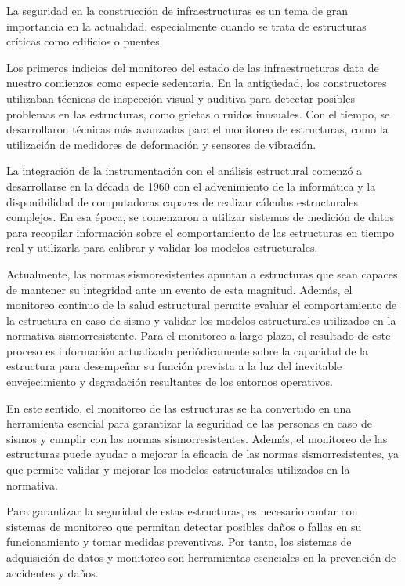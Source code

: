 \documentclass[12pt,letterpaper]{article}
\begin{document}
La seguridad en la construcción de infraestructuras es un tema de gran importancia en la actualidad, especialmente cuando se trata de estructuras críticas como edificios o puentes.

Los primeros indicios del monitoreo del estado de las infraestructuras data de nuestro comienzos como especie sedentaria.  En la antigüedad, los constructores utilizaban técnicas de inspección visual y auditiva para detectar posibles problemas en las estructuras, como grietas o ruidos inusuales. Con el tiempo, se desarrollaron técnicas más avanzadas para el monitoreo de estructuras, como la utilización de medidores de deformación y sensores de vibración.

La integración de la instrumentación con el análisis estructural comenzó a desarrollarse en la década de 1960 con el advenimiento de la informática y la disponibilidad de computadoras capaces de realizar cálculos estructurales complejos. En esa época, se comenzaron a utilizar sistemas de medición de datos para recopilar información sobre el comportamiento de las estructuras en tiempo real y utilizarla para calibrar y validar los modelos estructurales.

Actualmente, las normas sismoresistentes apuntan a estructuras que sean capaces de mantener su integridad ante un evento de esta magnitud. Además, el monitoreo continuo de la salud estructural permite evaluar el comportamiento de la estructura en caso de sismo y validar los modelos estructurales utilizados en la normativa sismorresistente. Para el monitoreo a largo plazo, el resultado de este proceso es información actualizada periódicamente sobre la capacidad de la estructura para desempeñar su función prevista a la luz del inevitable envejecimiento y degradación resultantes de los entornos operativos.


En este sentido, el monitoreo de las estructuras se ha convertido en una herramienta esencial para garantizar la seguridad de las personas en caso de sismos y cumplir con las normas sismorresistentes. Además, el monitoreo de las estructuras puede ayudar a mejorar la eficacia de las normas sismorresistentes, ya que permite validar y mejorar los modelos estructurales utilizados en la normativa.

Para garantizar la seguridad de estas estructuras, es necesario contar con sistemas de monitoreo que permitan detectar posibles daños o fallas en su funcionamiento y tomar medidas preventivas. Por tanto, los sistemas de adquisición de datos y monitoreo son herramientas esenciales en la prevención de accidentes y daños.
\end{document}
